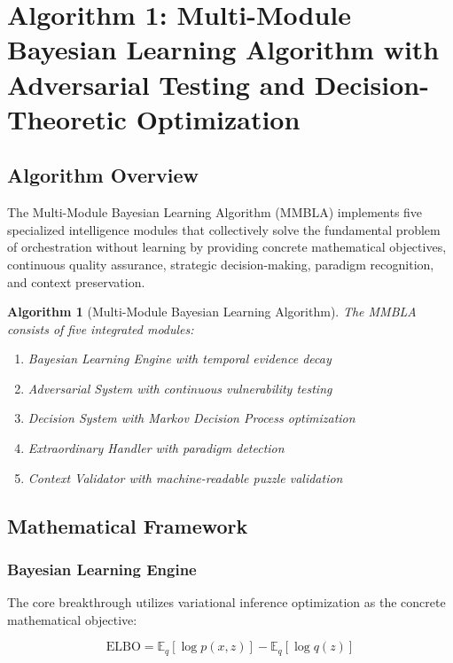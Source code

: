 \documentclass[12pt,a4paper]{article}
\newtheorem{algorithm_def}[theorem]{Algorithm}
\begin{document}
\section{Algorithm 1: Multi-Module Bayesian Learning Algorithm with Adversarial Testing and Decision-Theoretic Optimization}

\subsection{Algorithm Overview}

The Multi-Module Bayesian Learning Algorithm (MMBLA) implements five specialized intelligence modules that collectively solve the fundamental problem of orchestration without learning by providing concrete mathematical objectives, continuous quality assurance, strategic decision-making, paradigm recognition, and context preservation.

\begin{algorithm_def}[Multi-Module Bayesian Learning Algorithm]
\label{alg:mmbla}
The MMBLA consists of five integrated modules:
\begin{enumerate}
    \item Bayesian Learning Engine with temporal evidence decay
    \item Adversarial System with continuous vulnerability testing
    \item Decision System with Markov Decision Process optimization
    \item Extraordinary Handler with paradigm detection
    \item Context Validator with machine-readable puzzle validation
\end{enumerate}
\end{algorithm_def}

\subsection{Mathematical Framework}

\subsubsection{Bayesian Learning Engine}

The core breakthrough utilizes variational inference optimization as the concrete mathematical objective:

\begin{equation}
\text{ELBO} = \mathbb{E}_q[\log p(x,z)] - \mathbb{E}_q[\log q(z)]
\end{equation}
\end{document}
